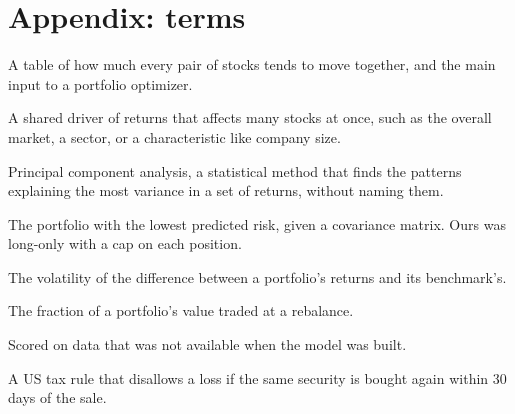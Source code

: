\documentclass[11pt,letterpaper]{article}
\begin{document}
\section{Appendix: terms}

\begin{description}[leftmargin=0pt,itemsep=0.3em]
\item[Covariance matrix.] A table of how much every pair of stocks tends to move together,
and the main input to a portfolio optimizer.
\item[Factor.] A shared driver of returns that affects many stocks at once, such as the
overall market, a sector, or a characteristic like company size.
\item[PCA.] Principal component analysis, a statistical method that finds the patterns
explaining the most variance in a set of returns, without naming them.
\item[Minimum-variance portfolio.] The portfolio with the lowest predicted risk, given a
covariance matrix. Ours was long-only with a cap on each position.
\item[Tracking error.] The volatility of the difference between a portfolio's returns and
its benchmark's.
\item[Turnover.] The fraction of a portfolio's value traded at a rebalance.
\item[Out of sample.] Scored on data that was not available when the model was built.
\item[Wash-sale rule.] A US tax rule that disallows a loss if the same security is bought
again within 30 days of the sale.
\end{description}
\end{document}

